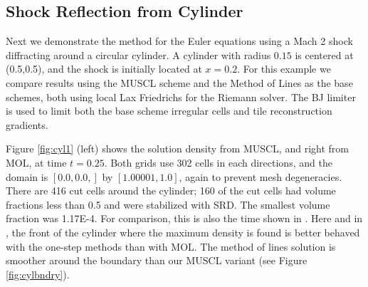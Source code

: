 \subsection{Shock Reflection from  Cylinder}
Next we demonstrate the method for the Euler equations using a Mach 2
shock diffracting around a circular cylinder. A cylinder with radius $0.15$ is centered at
(0.5,0.5), and the shock is initially located at $x = 0.2$.
For this example we compare results using the MUSCL scheme and
the Method of Lines as the base schemes, both using local Lax Friedrichs for the Riemann
solver. The BJ limiter is used to limit
both the base scheme irregular cells  and tile reconstruction gradients. 

Figure \ref{fig:cyl1} (left) shows the solution density from MUSCL, and
right from MOL, at time $t=0.25$. 
Both grids use 302 cells in each
directions, and the domain is  $[0.0,0.0,]$ by  $[1.00001, 1.0]$, again to
prevent mesh degeneracies.
There are 416 cut cells
around the cylinder; 160 of the cut cells had volume fractions less than
0.5 and were stabilized with SRD.  The smallest volume fraction was 1.17E-4.   
For comparison, this is also the time shown in \cite{mjb-hel-rjl:hbox2}. 
Here and in \cite{mjb-hel-rjl:hbox2}, the front of the cylinder where the
maximum density is found is better behaved with the one-step methods than with
MOL.  The method of lines solution is smoother around the boundary than our
MUSCL variant (see Figure \ref{fig:cylbndry}).

